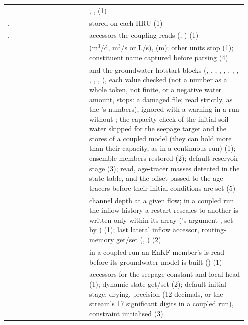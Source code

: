\begin{longtable}{P{0.32\linewidth}P{0.628\linewidth}}
 & , ,  (1)\\
,  &  stored on each HRU (1)\\
,  & accessors the coupling reads (, ) (1)\\
 &  (m$^3$/d, m$^3$/s or L/s),  (m); other units stop (1); constituent name captured before parsing (4)\\
 &  and the groundwater hotstart blocks (, , , , , , , , , , , ), each value checked (not a number as a whole token, not finite, or a negative water amount, stops: a damaged file;  read strictly, as the 's numbers), ignored with a warning in a run without ; the capacity check of the initial soil water skipped for the seepage target and the  stores of a coupled model (they can hold more than their capacity, as in a continuous run) (1); ensemble members restored (2); default reservoir stage (3);  read, age-tracer masses detected in the state table, and the offset passed to the age tracers before their initial conditions are set (5)\\
 & channel depth at a given flow; in a coupled run the inflow history a restart rescales to another  is written only within its array ('s argument , set by ) (1); last lateral inflow accessor, routing-memory get/set (, ) (2)\\
 & in a coupled run an EnKF member's  is read before its groundwater model is built () (1)\\
 & accessors for the seepage constant and local head (1); dynamic-state get/set (2); default initial stage, drying,  precision (12 decimals, or the stream's 17 significant digits in a coupled run), constraint initialised (3)\\

\end{longtable}

